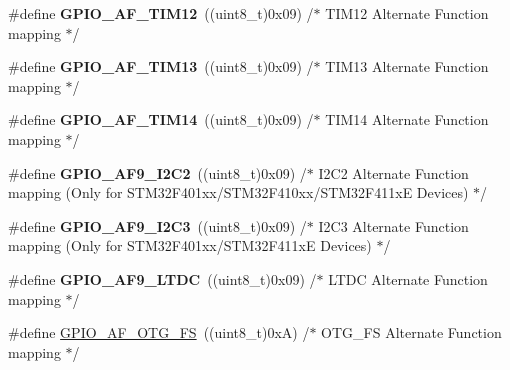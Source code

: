 \begin{DoxyCompactItemize}
\#define {\bfseries G\+P\+I\+O\+\_\+\+A\+F\+\_\+\+T\+I\+M12}~((uint8\+\_\+t)0x09)  /$\ast$ T\+I\+M12 Alternate Function mapping $\ast$/
\item 
\mbox{\label{group___g_p_i_o___alternat__function__selection__define_gae89e027f14289052d5c51b4c96f79702}} 
\#define {\bfseries G\+P\+I\+O\+\_\+\+A\+F\+\_\+\+T\+I\+M13}~((uint8\+\_\+t)0x09)  /$\ast$ T\+I\+M13 Alternate Function mapping $\ast$/
\item 
\mbox{\label{group___g_p_i_o___alternat__function__selection__define_ga9341da4e7ba3921ed1a683df3ec0e41b}} 
\#define {\bfseries G\+P\+I\+O\+\_\+\+A\+F\+\_\+\+T\+I\+M14}~((uint8\+\_\+t)0x09)  /$\ast$ T\+I\+M14 Alternate Function mapping $\ast$/
\item 
\mbox{\label{group___g_p_i_o___alternat__function__selection__define_ga36c78e6a830d7f6dbfad861aef823516}} 
\#define {\bfseries G\+P\+I\+O\+\_\+\+A\+F9\+\_\+\+I2\+C2}~((uint8\+\_\+t)0x09)  /$\ast$ I2\+C2 Alternate Function mapping (\+Only for S\+T\+M32\+F401xx/\+S\+T\+M32\+F410xx/\+S\+T\+M32\+F411x\+E Devices) $\ast$/
\item 
\mbox{\label{group___g_p_i_o___alternat__function__selection__define_ga60a80c034971ba074757d17c67256900}} 
\#define {\bfseries G\+P\+I\+O\+\_\+\+A\+F9\+\_\+\+I2\+C3}~((uint8\+\_\+t)0x09)  /$\ast$ I2\+C3 Alternate Function mapping (\+Only for S\+T\+M32\+F401xx/\+S\+T\+M32\+F411x\+E Devices) $\ast$/
\item 
\mbox{\label{group___g_p_i_o___alternat__function__selection__define_ga86f857a054eb7ef3584579b34b1d040f}} 
\#define {\bfseries G\+P\+I\+O\+\_\+\+A\+F9\+\_\+\+L\+T\+DC}~((uint8\+\_\+t)0x09)  /$\ast$ L\+T\+D\+C Alternate Function mapping $\ast$/
\item 
\mbox{\label{group___g_p_i_o___alternat__function__selection__define_gaeba0aeefec841e505170efc7762ae588}} 
\#define \mbox{\hyperlink{group___g_p_i_o___alternat__function__selection__define_gaeba0aeefec841e505170efc7762ae588}{G\+P\+I\+O\+\_\+\+A\+F\+\_\+\+O\+T\+G\+\_\+\+FS}}~((uint8\+\_\+t)0x\+A)  /$\ast$ O\+T\+G\+\_\+\+F\+S Alternate Function mapping $\ast$/

\end{DoxyCompactItemize}
